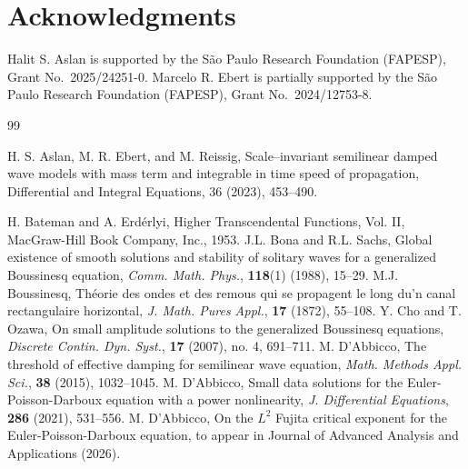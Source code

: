 \documentclass[10pt]{article}
\newcommand{\<}{\langle}
\renewcommand{\>}{\rangle}
\numberwithin{equation}{section}
\begin{document}
\section*{Acknowledgments}
Halit S. Aslan is supported by the S\~ao Paulo Research Foundation (FAPESP), Grant No.~2025/24251-0.
Marcelo R. Ebert is partially supported by the S\~ao Paulo Research Foundation (FAPESP), Grant No.~2024/12753-8.
\begin{thebibliography}{99}

 H. S. Aslan, M. R. Ebert, and M. Reissig, Scale–invariant semilinear damped wave models with mass term and integrable in time speed of propagation, Differential and Integral Equations, 36 (2023), 453--490.


H. Bateman and A. Erd\'erlyi, Higher Transcendental Functions, Vol. II, MacGraw-Hill Book Company, Inc., 1953.
J.L. Bona and R.L. Sachs, Global existence of smooth solutions and stability of solitary waves for a generalized Boussinesq equation,
\textit{Comm. Math. Phys.}, \textbf{118}(1) (1988), 15--29.
M.J. Boussinesq, Th\'{e}orie des ondes et des remous qui se propagent le long du'n canal rectangulaire horizontal, \textit{J. Math. Pures Appl.}, \textbf{17} (1872), 55--108.
Y. Cho and T. Ozawa,
On small amplitude solutions to the generalized Boussinesq equations, \textit{Discrete Contin. Dyn. Syst.}, \textbf{17} (2007), no. 4, 691--711.
M. D'Abbicco, The threshold of effective damping for semilinear wave equation, \textit{Math. Methods Appl. Sci.}, \textbf{38} (2015), 1032--1045.
M. D'Abbicco, Small data solutions for the Euler-Poisson-Darboux equation with a power nonlinearity, \textit{J. Differential Equations}, \textbf{286} (2021), 531--556.
 M. D'Abbicco, On the $L^2$ Fujita critical exponent for the
Euler-Poisson-Darboux equation, to appear in Journal of Advanced Analysis and Applications (2026).


\end{thebibliography}
\end{document}
